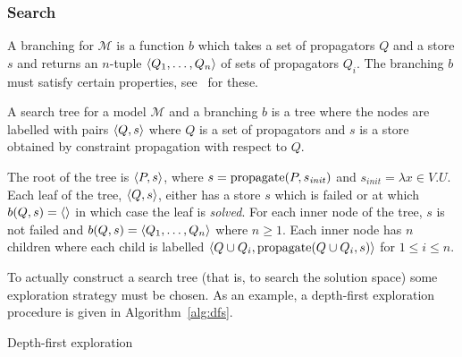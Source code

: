 \subsubsection{Search}
A branching for $\mathscr{M}$ is a function $b$ which takes a set of propagators $Q$ and a store $s$ and returns an $n$-tuple $\left\langle Q_1,\ldots,Q_n\right\rangle$ of sets of propagators $Q_i$. The branching $b$ must satisfy certain properties, see~\cite{lecturenotes} for these.

A search tree for a model $\mathscr{M}$ and a branching $b$ is a tree where the nodes are labelled with pairs $\left\langle Q,s\right\rangle$ where $Q$ is a set of propagators and $s$ is a store obtained by constraint propagation with respect to $Q$.

The root of the tree is $\left\langle P,s\right\rangle$, where $s = \operatorname{propagate}(P,s_{\mathit{init}})$ and $s_{\mathit{init}} = \lambda x \in V . U$.
Each leaf of the tree, $\left\langle Q,s\right\rangle$, either has a store $s$ which is failed or at which $b(Q,s)=\left\langle \right\rangle$ in which case the leaf is \textit{solved}.
For each inner node of the tree, $s$ is not failed and $b(Q,s) = \left\langle Q_1,\ldots,Q_n\right\rangle$ where $n \geq 1$. 
Each inner node has $n$ children where each child is labelled $\left\langle Q \cup Q_i, \operatorname{propagate}(Q \cup Q_i,s)\right\rangle$ for $1 \leq i \leq n$.

To actually construct a search tree (that is, to search the solution space) some exploration strategy must be chosen. As an example, a depth-first exploration procedure is given in Algorithm~\ref{alg:dfs}.

\begin{algorithm}[ht]
    \caption{Depth-first exploration}
    \label{alg:dfs}
    \begin{algorithmic}
            \Else
                \Of{$\tuple{}$}
                    \Else
                    \EndIf
                \EndCase
            \EndIf
        \EndFunction
    \end{algorithmic}
\end{algorithm}
